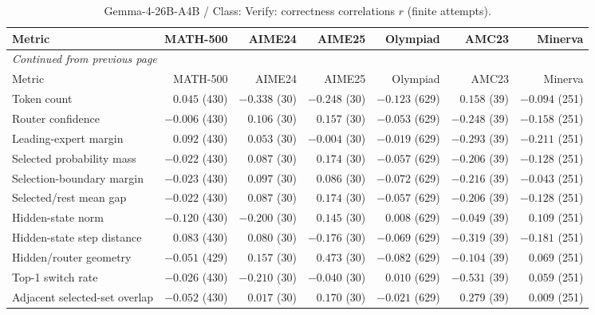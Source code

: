 \begingroup\scriptsize\setlength{\tabcolsep}{4pt}
\begin{longtable}{@{}lrrrrrr@{}}
\caption{Gemma-4-26B-A4B / Class: Verify: correctness correlations $r$ (finite attempts).}\label{tab:multi-gemma-class-Verify}\\
\toprule
Metric & MATH-500 & AIME24 & AIME25 & Olympiad & AMC23 & Minerva \\
\midrule\endfirsthead
\multicolumn{7}{l}{\textit{Continued from previous page}}\\
\toprule
Metric & MATH-500 & AIME24 & AIME25 & Olympiad & AMC23 & Minerva \\
\midrule\endhead
\bottomrule\endfoot
Token count & $0.045$ (430) & $-0.338$ (30) & $-0.248$ (30) & $-0.123$ (629) & $0.158$ (39) & $-0.094$ (251) \\
Router confidence & $-0.006$ (430) & $0.106$ (30) & $0.157$ (30) & $-0.053$ (629) & $-0.248$ (39) & $-0.158$ (251) \\
Leading-expert margin & $0.092$ (430) & $0.053$ (30) & $-0.004$ (30) & $-0.019$ (629) & $-0.293$ (39) & $-0.211$ (251) \\
Selected probability mass & $-0.022$ (430) & $0.087$ (30) & $0.174$ (30) & $-0.057$ (629) & $-0.206$ (39) & $-0.128$ (251) \\
Selection-boundary margin & $-0.023$ (430) & $0.097$ (30) & $0.086$ (30) & $-0.072$ (629) & $-0.216$ (39) & $-0.043$ (251) \\
Selected/rest mean gap & $-0.022$ (430) & $0.087$ (30) & $0.174$ (30) & $-0.057$ (629) & $-0.206$ (39) & $-0.128$ (251) \\
Hidden-state norm & $-0.120$ (430) & $-0.200$ (30) & $0.145$ (30) & $0.008$ (629) & $-0.049$ (39) & $0.109$ (251) \\
Hidden-state step distance & $0.083$ (430) & $0.080$ (30) & $-0.176$ (30) & $-0.069$ (629) & $-0.319$ (39) & $-0.181$ (251) \\
Hidden/router geometry & $-0.051$ (429) & $0.157$ (30) & $0.473$ (30) & $-0.082$ (629) & $-0.104$ (39) & $0.069$ (251) \\
Top-1 switch rate & $-0.026$ (430) & $-0.210$ (30) & $-0.040$ (30) & $0.010$ (629) & $-0.531$ (39) & $0.059$ (251) \\
Adjacent selected-set overlap & $-0.052$ (430) & $0.017$ (30) & $0.170$ (30) & $-0.021$ (629) & $0.279$ (39) & $0.009$ (251) \\
\end{longtable}\endgroup

